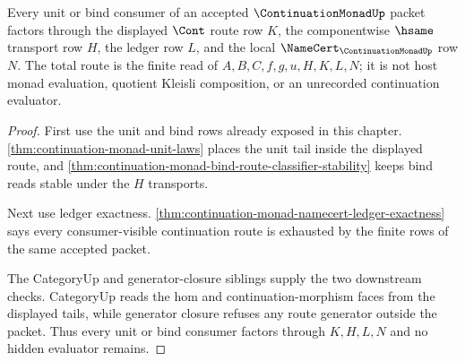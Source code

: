 \begin{theorem}
\label{thm:continuation-monad-cont-route-ledger-totality}
Every unit or bind consumer of an accepted $\ContinuationMonadUp$ packet factors through the displayed $\Cont$ route row $K$, the componentwise $\hsame$ transport row $H$, the ledger row $L$, and the local $\NameCert_{\ContinuationMonadUp}$ row $N$. The total route is the finite read of $A,B,C,f,g,u,H,K,L,N$; it is not host monad evaluation, quotient Kleisli composition, or an unrecorded continuation evaluator.
\end{theorem}
\begin{proof}
First use the unit and bind rows already exposed in this chapter. \autoref{thm:continuation-monad-unit-laws} places the unit tail inside the displayed route, and \autoref{thm:continuation-monad-bind-route-classifier-stability} keeps bind reads stable under the $H$ transports.

Next use ledger exactness. \autoref{thm:continuation-monad-namecert-ledger-exactness} says every consumer-visible continuation route is exhausted by the finite rows of the same accepted packet.

The CategoryUp and generator-closure siblings supply the two downstream checks. CategoryUp reads the hom and continuation-morphism faces from the displayed tails, while generator closure refuses any route generator outside the packet. Thus every unit or bind consumer factors through $K,H,L,N$ and no hidden evaluator remains.
\end{proof}

